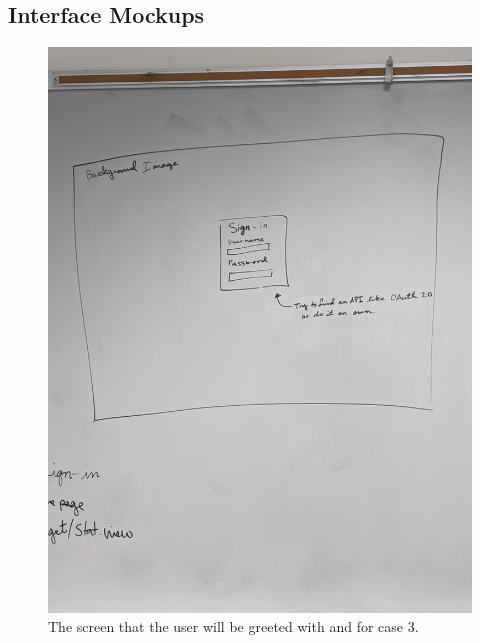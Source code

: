 \documentclass[10pt,conference,onecolumn,compsoc]{IEEEtran}
\begin{document}

\subsection{Interface Mockups}

\smallskip

\begin{figure}[h]
\centering
\begin{minipage}{.5\textwidth}
\centering
\includegraphics[scale = .05]{LoginIn.jpg}
\caption{The screen that the user will be greeted with and for case 3.}
\label{LoginScreen}
\end{minipage}%
\begin{minipage}{.5\textwidth}
\centering

\end{minipage}
\end{figure}
\end{document}
